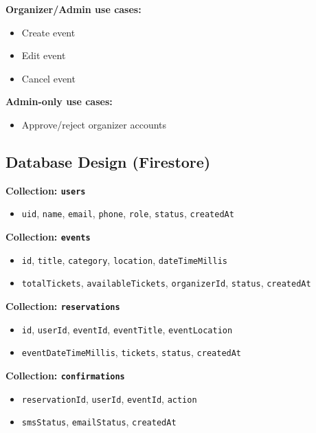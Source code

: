 \documentclass[12pt,a4paper]{article}
\begin{document}
\textbf{Organizer/Admin use cases:}
\begin{itemize}
    \item Create event
    \item Edit event
    \item Cancel event
\end{itemize}

\textbf{Admin-only use cases:}
\begin{itemize}
    \item Approve/reject organizer accounts
\end{itemize}

\subsection{Database Design (Firestore)}

\textbf{Collection: \texttt{users}}
\begin{itemize}
    \item \texttt{uid}, \texttt{name}, \texttt{email}, \texttt{phone}, \texttt{role}, \texttt{status}, \texttt{createdAt}
\end{itemize}

\textbf{Collection: \texttt{events}}
\begin{itemize}
    \item \texttt{id}, \texttt{title}, \texttt{category}, \texttt{location}, \texttt{dateTimeMillis}
    \item \texttt{totalTickets}, \texttt{availableTickets}, \texttt{organizerId}, \texttt{status}, \texttt{createdAt}
\end{itemize}

\textbf{Collection: \texttt{reservations}}
\begin{itemize}
    \item \texttt{id}, \texttt{userId}, \texttt{eventId}, \texttt{eventTitle}, \texttt{eventLocation}
    \item \texttt{eventDateTimeMillis}, \texttt{tickets}, \texttt{status}, \texttt{createdAt}
\end{itemize}

\textbf{Collection: \texttt{confirmations}}
\begin{itemize}
    \item \texttt{reservationId}, \texttt{userId}, \texttt{eventId}, \texttt{action}
    \item \texttt{smsStatus}, \texttt{emailStatus}, \texttt{createdAt}
\end{itemize}
\end{document}
